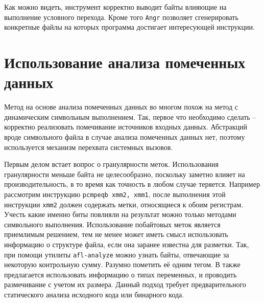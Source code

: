 Как можно видеть, инструмент корректно выводит байты влияющие на выполнение условного перехода. Кроме того \texttt{Angr} позволяет сгенерировать конкретные файлы на которых программа достигает интересующей инструкции.







\section{Использование анализа помеченных данных}

Метод на основе анализа помеченных данных во многом похож на метод с динамическим символьным выполнением. Так, первое что необходимо сделать -- корректно реализовать помечивание источников входных данных. Абстракций вроде символьного файла в случае анализа помеченных данных нет, поэтому используется механизм перехвата системных вызовов.

Первым делом встает вопрос о гранулярности меток. Использования гранулярности меньше байта не целесообразно, поскольку заметно влияет на производительность, в то время как точность в любом случае теряется. Например рассмотрим инструкцию \texttt{pcmpeqb xmm2, xmm1}, после выполнения этой инструкции \texttt{xmm2} должен содержать метки, относящиеся к обоим регистрам. Учесть какие именно биты повлияли на результат можно только методами символьного выполнения.
Использование побайтовых меток является приемлимым решением, тем не менее может иметь смысл использовать информацию о структуре файла, если она заранее известна для разметки. Так, при помощи утилиты \texttt{afl-analyze} можно узнать байты, отвечающие за некоторую контрольную сумму. Разумно пометить её одним тегом. В \cite{Angora} также предлагается использовать информацию о типах переменных, и проводить размечивание с учетом их размера. Данный подход требует предварительного статического анализа исходного кода или бинарного кода.

